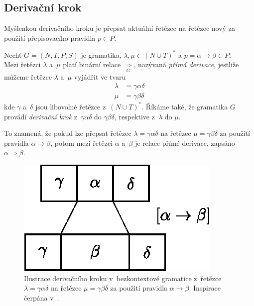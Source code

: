 \subsection*{Derivační krok}\label{kap_der_krok}
Myšlenkou derivačního kroku je přepsat aktuální řetězec na řetězec nový za použití přepisovacího pravidla $p \in P$.
\begin{definition}\label{def_derivacni_krok}
    Nechť $G = (N, T, P, S)$ je gramatika, $\lambda, \mu  \in (N \cup T)^*$ a $p = \alpha \rightarrow \beta \in P$. \\
    Mezi řetězci $\lambda$ a~$\mu$ platí binární relace $\underset{\scriptscriptstyle G}{\Rightarrow}$, nazývaná \emph{přímá derivace}, jestliže můžeme řetězce $\lambda$ a~$\mu$ vyjádřit ve tvaru
    \begin{align*}
        \lambda &= \gamma \alpha \delta \\
        \mu &= \gamma \beta \delta 
    \end{align*}
    kde $\gamma$ a~$\delta$ jsou libovolné řetězce z~$(N \cup T)^*$. 
    Říkáme také, že gramatika $G$ provádí \emph{derivační krok} z~$\gamma \alpha \delta$ do $\gamma \beta \delta$, respektive z~$\lambda$ do $\mu$.
\end{definition}
To znamená, že pokud lze přepsat řetězec $\lambda = \gamma \alpha \delta$ na řetězec $\mu = \gamma \beta \delta$ za použití pravidla $\alpha \rightarrow \beta$, potom mezi řetězci $\alpha$ a~$\beta$ je relace přímé derivace, zapsáno $\alpha \Rightarrow \beta$.

\begin{figure}[ht]\label{fig_der_krok}
    \centering
    \vspace*{0.5em}
    \includegraphics{obrazky-figures/derivacni_krok_bkg.eps}
    \caption{Ilustrace derivačního kroku v~bezkontextové gramatice z~řetězce  $\lambda=\gamma \alpha \delta$ na řetězec $\mu=\gamma \beta \delta$ za použití pravidla $\alpha \rightarrow \beta$. Inspirace čerpána v~\cite{meduna2017modely}.}
\end{figure}


